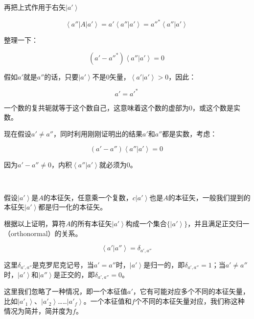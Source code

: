 再把上式作用于右矢$\left| a' \right\rangle$

\begin{equation}
\left\langle a'' \right| A \left| a' \right\rangle = a' \left\langle a'' | a' \right\rangle = a''^* \left\langle a'' | a' \right\rangle~
\end{equation}

整理一下：

\begin{equation}
\left( a' - a''^* \right) \left\langle a'' | a' \right\rangle = 0~
\end{equation}

假如$a'$就是$a''$的话，只要$\left| a' \right\rangle$不是0矢量，$\left\langle a' | a' \right\rangle > 0 $，因此：

\begin{equation}
a' = a'^*~
\end{equation}

一个数的复共轭就等于这个数自己，这意味着这个数的虚部为0，或这个数是实数。

现在假设$a' \neq a''$，同时利用刚刚证明出的结果$a'$和$a''$都是实数，考虑：

\begin{equation}
\left( a' - a'' \right) \left\langle a''  | a'  \right\rangle = 0~
\end{equation}

因为$a' - a'' \neq 0$，内积$\left\langle a''  | a'  \right\rangle$就必须为0。

~

假设$\left| a' \right\rangle$是$A$的本征矢，任意乘一个复数，$c \left| a' \right\rangle$也是$A$的本征矢，一般我们提到的本征矢$\left| a' \right\rangle$都是归一化的本征矢。

根据以上证明，算符$A$的所有本征矢$\left| a' \right\rangle$构成一个集合$\{ \left| a' \right\rangle \}$，并且满足正交归一（orthonormal）的关系。

\begin{equation}
\left\langle a' | a'' \right\rangle = \delta_{a', a''}~
\end{equation}

这里$\delta_{a', a''}$是克罗尼克记号，当$a' = a''$时，$\left| a' \right\rangle$是归一的，即$\delta_{a', a''} = 1$；当$a' \neq a''$时，$\left| a' \right\rangle$和$\left| a'' \right\rangle$是正交的，即$\delta_{a', a''} = 0$。

这里我们忽略了一种情况，即一个本征值$a'$，它有可能对应多个不同的本征矢量，比如$\left| a'_1 \right\rangle $、$\left| a'_2 \right\rangle $……$\left| a'_f \right\rangle$。一个本征值和$f$个不同的本征矢量对应，我们称这种情况为简并，简并度为$f$。

